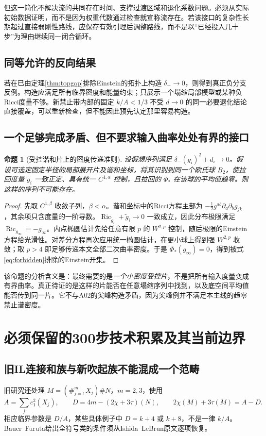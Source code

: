 \documentclass[UTF8,a4paper,11pt,fontset=fandol]{ctexart}
\numberwithin{equation}{section}
\newtheorem{proposition}[theorem]{命题}
\theoremstyle{definition}
\newcommand{\Ric}{\operatorname{Ric}}
\begin{document}
但这一简化不解决流的共同存在时间、支撑过渡区域和退化系数问题。必须从实际初始数据证明，而不是因为权重代数通过检查就宣称流存在。若该接口的复杂性长期超过直接弱刚性路线，应保存有效引理后调整路线，而不是以“已经投入几十步”为理由继续同一闭合循环。

\subsection{同等允许的反向结果}
若在已由定理\ref{thm:topgap}排除Einstein的拓扑上构造 $\delta_-\to0$，则得到真正负分支反例。构造应满足所有临界密度和能量约束；只展示一个塌缩局部模型或某种负Ricci度量不够。新禁止带内部的固定 $k/A<1/3$ 不受 $d\to0$ 的同一必要退化结论直接覆盖，可以重新检查，但不能因此预先认定那里容易构造。


\subsection{一个足够完成矛盾、但不要求输入曲率处处有界的接口}
\begin{proposition}[受控谐和片上的密度传递准则]\label{prop:minimalbridge}
设假想序列满足 $\delta_-(g_i)^2+d_i\to0$。假设可选定固定半径的局部展开片及谐和坐标，将其识别到同一个欧氏球 $B_2$，使拉回度量 $\widetilde g_i$ 一致正定、具有统一 $C^{1,\alpha}$ 控制，且拉回的 $\Phi_*$ 在该球的平均值趋零。则这样的序列不可能存在。
\end{proposition}
\begin{proof}
先取 $C^{1,\beta}$ 收敛子列，$\beta<\alpha$。谐和坐标中的Ricci方程主部为 $-\frac12 g^{ab}\partial_a\partial_b g_{jk}$，其余项只含度量的一阶导数。$\Ric_{\widetilde g_i}+\widetilde g_i\to0$ 一致成立，因此分布极限满足 $\Ric_{g_\infty}=-g_\infty$。内点椭圆估计先给任意有限 $p$ 的 $W^{2,p}$ 控制，随后极限的Einstein方程给光滑性。对差分方程再次应用统一椭圆估计，在更小球上得到强 $W^{2,p}$ 收敛；取 $p>4$ 即足够传递本文全部二次曲率密度。于是 $\Phi_*(g_\infty)=0$，得到被式\eqref{eq:forbidden}排除的Einstein开集。
\end{proof}
该命题的分析含义是：最终需要的是\emph{一个小密度受控片}，不是把所有输入度量变成有界曲率。真正待证的是这样的片能否在任意塌缩序列中找到，以及底空间平均值能否传到同一片。它不与A02的尖峰构造矛盾，因为尖峰例并不满足本主线的趋零禁止谱密度。

\section{必须保留的300步技术积累及其当前边界}
\subsection{旧IL连接和族与新吹起族不能混成一个范畴}
旧研究还处理 $M=(\#_{j=1}^{m}X_j)\#N$，$m=2,3$，使用
\[
A=\sum_j c_1^2(X_j),\qquad D=4m-(2\chi+3\tau)(N),\qquad
2\chi(M)+3\tau(M)=A-D.
\]
相应临界参数是 $D/A$，某些具体例子中 $D=k+4$ 或 $k+8$，不是一律 $k/A$。Bauer--Furuta给出全符号类的条件须从Ishida--LeBrun原文逐项恢复\cite{IL}。
\end{document}
